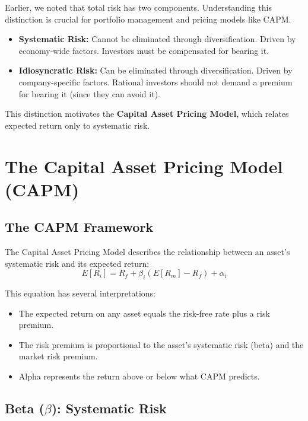 Earlier, we noted that total risk has two components. Understanding this distinction is crucial for portfolio management and pricing models like CAPM.

\begin{itemize}
    \item \textbf{Systematic Risk:} Cannot be eliminated through diversification. Driven by economy-wide factors. Investors must be compensated for bearing it.
    
    \item \textbf{Idiosyncratic Risk:} Can be eliminated through diversification. Driven by company-specific factors. Rational investors should not demand a premium for bearing it (since they can avoid it).
\end{itemize}

This distinction motivates the \textbf{Capital Asset Pricing Model}, which relates expected return only to systematic risk.

\section{The Capital Asset Pricing Model (CAPM)}

\subsection{The CAPM Framework}

The Capital Asset Pricing Model describes the relationship between an asset's systematic risk and its expected return:
\begin{equation}
    E[R_i] = R_f + \beta_i (E[R_m] - R_f) + \alpha_i
\end{equation}

This equation has several interpretations:
\begin{itemize}
    \item The expected return on any asset equals the risk-free rate plus a risk premium.
    \item The risk premium is proportional to the asset's systematic risk (beta) and the market risk premium.
    \item Alpha represents the return above or below what CAPM predicts.
\end{itemize}

\subsection{Beta ($\beta$): Systematic Risk}


